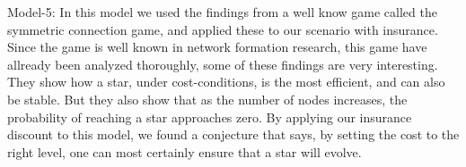 Model-5:
In this model we used the findings from a well know game called the symmetric connection game, and applied these to our scenario with insurance. Since the game is well known in network formation research, this game have allready been analyzed thoroughly, some of these findings are very interesting. They show how a star, under cost-conditions, is the most efficient, and can also be stable. But they also show that as the number of nodes increases, the probability of reaching a star approaches zero.
By applying our insurance discount to this model, we found a conjecture that says, by setting the cost to the right level, one can most certainly ensure that a star will evolve. 
